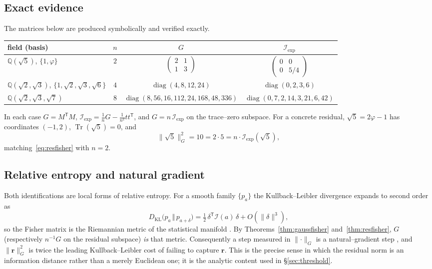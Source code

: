 \documentclass[11pt]{article}
\theoremstyle{plain}
\theoremstyle{definition}
\theoremstyle{remark}
\newcommand{\Q}{\mathbb{Q}}
\newcommand{\Tr}{\operatorname{Tr}}
\newcommand{\Fish}{\mathcal{I}}
\newcommand{\rr}{\mathbf{r}}
\newcommand{\GG}{G}
\newcommand{\transpose}{^{\mathsf{T}}}
\newcommand{\inv}{^{-1}}
\DeclareMathOperator{\diag}{diag}
\begin{document}
\subsection{Exact evidence}
The matrices below are produced symbolically and verified exactly.
\begin{center}
\begin{tabular}{lccc}
\toprule
field (basis) & $n$ & $\GG$ & $\Fish_{\mathrm{exp}}$ \\
\midrule
$\Q(\sqrt5)$, $\{1,\varphi\}$ & $2$ & $\left(\begin{smallmatrix}2&1\\1&3\end{smallmatrix}\right)$ &
   $\left(\begin{smallmatrix}0&0\\0&5/4\end{smallmatrix}\right)$ \\[2pt]
$\Q(\sqrt2,\sqrt3)$, $\{1,\sqrt2,\sqrt3,\sqrt6\}$ & $4$ & $\diag(4,8,12,24)$ & $\diag(0,2,3,6)$ \\[2pt]
$\Q(\sqrt2,\sqrt3,\sqrt7)$ & $8$ & $\diag(8,56,16,112,24,168,48,336)$ & $\diag(0,7,2,14,3,21,6,42)$ \\
\bottomrule
\end{tabular}
\end{center}
In each case $\GG=M\transpose M$, $\Fish_{\mathrm{exp}}=\tfrac1n\GG-\tfrac1{n^2}tt\transpose$, and
$\GG=n\,\Fish_{\mathrm{exp}}$ on the trace--zero subspace. For a concrete residual, $\sqrt5=2\varphi-1$ has
coordinates $(-1,2)$, $\Tr(\sqrt5)=0$, and
\[
  \lVert\sqrt5\rVert_{\GG}^2=10=2\cdot 5=n\cdot\Fish_{\mathrm{exp}}(\sqrt5),
\]
matching~\eqref{eq:resfisher} with $n=2$.

\subsection{Relative entropy and natural gradient}
Both identifications are local forms of relative entropy. For a smooth family $\{p_a\}$ the
Kullback--Leibler divergence expands to second order as
\[
  D_{\mathrm{KL}}\!\big(p_{a}\,\Vert\,p_{a+\delta}\big)=\tfrac12\,\delta\transpose\Fish(a)\,\delta
  +O(\lVert\delta\rVert^3),
\]
so the Fisher matrix is the Riemannian metric of the statistical manifold \cite{AmariNagaoka}. By
Theorems~\ref{thm:gaussfisher} and~\ref{thm:resfisher}, $\GG$ (respectively $n\inv\GG$ on the residual
subspace) \emph{is} that metric. Consequently a step measured in $\lVert\cdot\rVert_{\GG}$ is a
natural--gradient step \cite{Amari}, and $\lVert\rr\rVert_{\GG}^2$ is twice the leading Kullback--Leibler
cost of failing to capture $\rr$. This is the precise sense in which the residual norm is an information
distance rather than a merely Euclidean one; it is the analytic content used in \S\ref{sec:threshold}.
\end{document}
